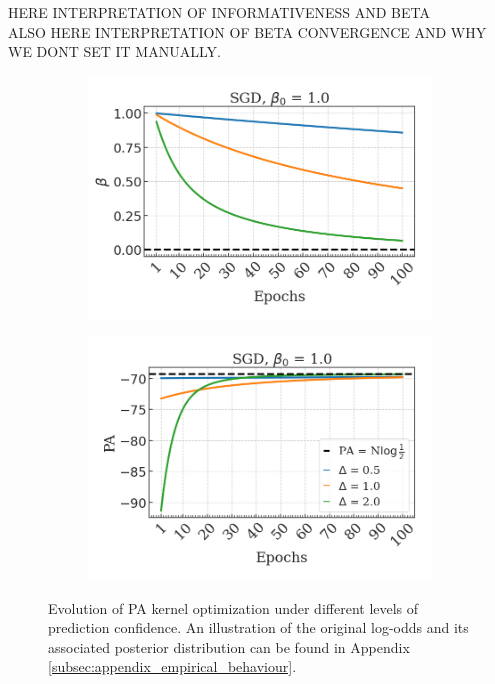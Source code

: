 HERE INTERPRETATION OF INFORMATIVENESS AND BETA \\

ALSO HERE INTERPRETATION OF BETA CONVERGENCE AND WHY WE DONT SET IT MANUALLY. \\

\begin{figure}[H]
    \centering
    \begin{subfigure}[b]{0.45\textwidth}
        \centering
        \includegraphics[width=\textwidth]{img/results_discussion/empirical/nonrob_met=betas_hue=ldiff.png}
    \end{subfigure}
    \hfill
    \begin{subfigure}[b]{0.45\textwidth}
        \centering
        \includegraphics[width=\textwidth]{img/results_discussion/empirical/nonrob_met=logPA_hue=ldiff.png}
    \end{subfigure}
    \caption{Evolution of PA kernel optimization under different levels of prediction 
    confidence. An illustration of the original log-odds and its associated posterior distribution
    can be found in Appendix \ref{subsec:appendix_empirical_behaviour}.}
    \label{fig:prediction_confidence}
\end{figure}

